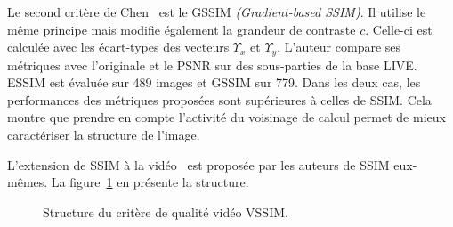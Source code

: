 Le second critère de Chen~\cite{chen-icip2006} est le GSSIM \emph{(Gradient-based SSIM)}. Il utilise le même principe mais modifie également la grandeur de contraste $c$. Celle-ci est calculée avec les écart-types des vecteurs $\Upsilon_x$ et $\Upsilon_y$. L'auteur compare ses métriques avec l'originale et le PSNR sur des sous-parties de la base LIVE. ESSIM est évaluée sur 489 images et GSSIM sur 779. Dans les deux cas, les performances des métriques proposées sont supérieures à celles de SSIM. Cela montre que prendre en compte l'activité du voisinage de calcul permet de mieux caractériser la structure de l'image.

L'extension de SSIM à la vidéo~\cite{wang-vqasdm} est proposée par les auteurs de SSIM eux-mêmes. La figure~\ref{fig:VSSIM} en présente la structure.

\begin{figure}[htbp]
	\centering
	\begin{tikzpicture}[text centered, text width=2cm,node distance=3cm]\end{tikzpicture}
	\caption{Structure du critère de qualité vidéo VSSIM.}
	\label{fig:VSSIM}
\end{figure}


